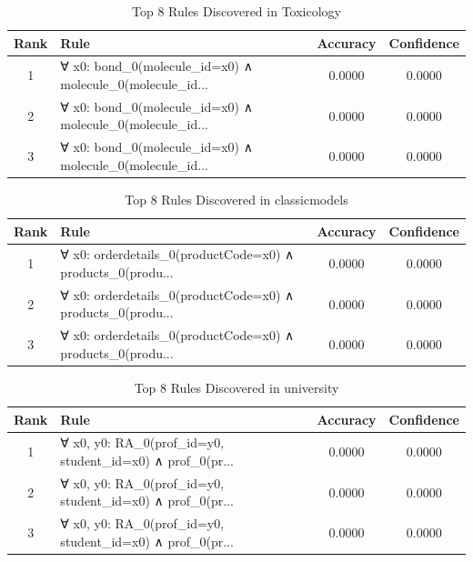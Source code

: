 \documentclass[11pt,a4paper]{article}
\begin{document}
\begin{table}[h!]
\centering
\small
\caption{Top 8 Rules Discovered in Toxicology}
\label{tab:rules_Toxicology}
\begin{tabular}{|c|p{5cm}|c|c|}
\hline
\textbf{Rank} & \textbf{Rule} & \textbf{Accuracy} & \textbf{Confidence} \\
\hline
1 & ∀ x0: bond\_0(molecule\_id=x0) ∧ molecule\_0(molecule\_id... & 0.0000 & 0.0000 \\
2 & ∀ x0: bond\_0(molecule\_id=x0) ∧ molecule\_0(molecule\_id... & 0.0000 & 0.0000 \\
3 & ∀ x0: bond\_0(molecule\_id=x0) ∧ molecule\_0(molecule\_id... & 0.0000 & 0.0000 \\
\hline
\end{tabular}
\end{table}

\begin{table}[h!]
\centering
\small
\caption{Top 8 Rules Discovered in classicmodels}
\label{tab:rules_classicmodels}
\begin{tabular}{|c|p{5cm}|c|c|}
\hline
\textbf{Rank} & \textbf{Rule} & \textbf{Accuracy} & \textbf{Confidence} \\
\hline
1 & ∀ x0: orderdetails\_0(productCode=x0) ∧ products\_0(produ... & 0.0000 & 0.0000 \\
2 & ∀ x0: orderdetails\_0(productCode=x0) ∧ products\_0(produ... & 0.0000 & 0.0000 \\
3 & ∀ x0: orderdetails\_0(productCode=x0) ∧ products\_0(produ... & 0.0000 & 0.0000 \\
\hline
\end{tabular}
\end{table}

\begin{table}[h!]
\centering
\small
\caption{Top 8 Rules Discovered in university}
\label{tab:rules_university}
\begin{tabular}{|c|p{5cm}|c|c|}
\hline
\textbf{Rank} & \textbf{Rule} & \textbf{Accuracy} & \textbf{Confidence} \\
\hline
1 & ∀ x0, y0: RA\_0(prof\_id=y0, student\_id=x0) ∧ prof\_0(pr... & 0.0000 & 0.0000 \\
2 & ∀ x0, y0: RA\_0(prof\_id=y0, student\_id=x0) ∧ prof\_0(pr... & 0.0000 & 0.0000 \\
3 & ∀ x0, y0: RA\_0(prof\_id=y0, student\_id=x0) ∧ prof\_0(pr... & 0.0000 & 0.0000 \\
\hline
\end{tabular}
\end{table}
\end{document}
